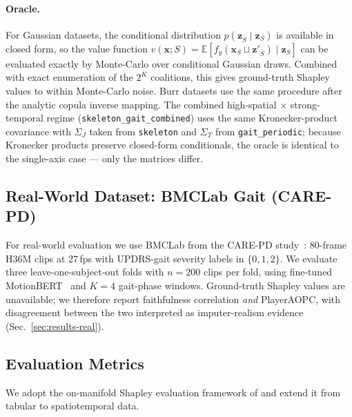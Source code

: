 \paragraph{Oracle.}
For Gaussian datasets, the conditional distribution
$p(\mathbf{z}_{\bar S}\mid\mathbf{z}_S)$ is available in closed form, so
the value function
$v(\mathbf{x};S) = \mathbb{E}[f_y(\mathbf{x}_S\sqcup\mathbf{z}'_{\bar S})\mid \mathbf{z}_S]$
can be evaluated exactly by Monte-Carlo over conditional Gaussian draws.
Combined with exact enumeration of the $2^K$ coalitions, this gives
ground-truth Shapley values to within Monte-Carlo noise.  Burr datasets
use the same procedure after the analytic copula inverse mapping.  The
combined high-spatial $\times$ strong-temporal regime
(\texttt{skeleton\_gait\_combined}) uses the same Kronecker-product
covariance with $\Sigma_J$ taken from \texttt{skeleton} and $\Sigma_T$
from \texttt{gait\_periodic}; because Kronecker products preserve closed-form
conditionals, the oracle is identical to the single-axis case --- only
the matrices differ.

\subsection{Real-World Dataset: BMCLab Gait (CARE-PD)}
\label{sec:real-data}

For real-world evaluation we use BMCLab from the CARE-PD
study~\citep{adeli2025multi}: 80-frame H36M clips at 27\,fps with UPDRS-gait
severity labels in $\{0, 1, 2\}$.  We evaluate three leave-one-subject-out
folds with $n{=}200$ clips per fold, using fine-tuned
MotionBERT~\citep{zhu2023motionbert} and $K{=}4$ gait-phase windows.
Ground-truth Shapley values are unavailable; we therefore report
faithfulness correlation \emph{and} PlayerAOPC, with disagreement
between the two interpreted as imputer-realism evidence
(Sec.~\ref{sec:results-real}).

\subsection{Evaluation Metrics}
\label{sec:metrics}

We adopt the on-manifold Shapley evaluation framework of
\citet{olsen2022using} and extend it from tabular to spatiotemporal data.

